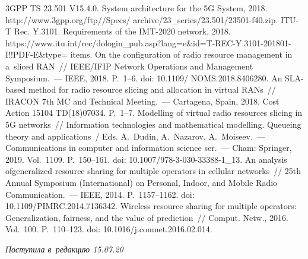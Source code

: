 \begin{multicols}{2}
{{\begin{thebibliography}{9}
 
3GPP TS 23.501 V15.4.0. System architecture for the 5G System, 2018. {\sf 
http://www.3gpp.org/ftp//Specs/ archive/23\_series/23.501/23501-f40.zip}.
ITU-T Rec. Y.3101. Requirements of the IMT-2020 network, 2018. {\sf 
https://www.itu.int/rec/dologin\_pub.asp?\linebreak lang=e\&id=T-REC-Y.3101-201801-I!!PDF-E\&type= items}.
 On 
the configuration of radio resource management in a~sliced RAN~// IEEE/IFIP 
Network Operations and Management Symposium.~--- IEEE, 2018. P.~1--6. doi: 
10.1109/ NOMS.2018.8406280.
 An SLA-based method for radio resource slicing 
and allocation in virtual %
 RANs~// IRACON 7th MC and Technical Meeting.~--- 
Cartagena, Spain, 2018. Cost Action 15104 TD(18)07034. P.~1--7.
Modelling of virtual radio resources slicing in 5G networks~// 
Information technologies and 
mathematical modelling. Queueing theory and applications~/
Eds. A.~Dudin, A.~Nazarov, A.~Moiseev.~--- Communications in 
computer and information science ser.~--- Cham: Springer, 2019.  
Vol.~1109. P.~150--161. doi: 10.1007/978-3-030-33388-1\_13.
 An analysis of\linebreak gen\-er\-al\-ized 
resource sharing for multiple 
operators in cel\-lu\-lar networks~// 25th Annual Symposium
 (In\-ter\-na\-tion\-al) on Personal, Indoor, 
and Mobile Radio Com\-mu\-ni\-ca\-tion.~--- IEEE, 2014. P.~1157--1162. doi: 
10.1109/\linebreak \mbox{PIMRC}.2014.7136342.
 Wireless resource sharing for multiple operators: 
Generalization, fairness, and the value of prediction~// Comput. Netw., 2016. Vol.~100. 
P.~110--123. doi: 10.1016/j.comnet.2016.02.014.
\end{thebibliography}

 }
 }

\end{multicols}

\vspace*{-6pt}

\hfill{\small\textit{Поступила в~редакцию 15.07.20}}

